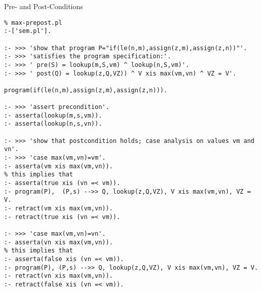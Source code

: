 \documentclass{beamer}
\begin{document}
\begin{frame}[fragile]{Pre- and Post-Conditions}

\tiny
\begin{verbatim}
% max-prepost.pl
:-['sem.pl'].

:- >>> 'show that program P="if(le(n,m),assign(z,m),assign(z,n))"'.
:- >>> 'satisfies the program specification:'.
:- >>> ' pre(S) = lookup(m,S,vm) ^ lookup(n,S,vm)'.
:- >>> ' post(Q) = lookup(z,Q,VZ)) ^ V xis max(vm,vn) ^ VZ = V'.

program(if(le(n,m),assign(z,m),assign(z,n))).

:- >>> 'assert precondition'.
:- asserta(lookup(m,s,vm)).
:- asserta(lookup(n,s,vn)).                                                                        
                                                                                                   
:- >>> 'show that postcondition holds; case analysis on values vm and vn'.                                                       
:- >>> 'case max(vm,vn)=vm'.                                                                       
:- asserta(vm xis max(vm,vn)).
% this implies that
:- asserta(true xis (vn =< vm)).
:- program(P),  (P,s) -->> Q, lookup(z,Q,VZ), V xis max(vm,vn), VZ = V.
:- retract(vm xis max(vm,vn)).
:- retract(true xis (vn =< vm)).

:- >>> 'case max(vm,vn)=vn'.
:- asserta(vn xis max(vm,vn)).
% this implies that
:- asserta(false xis (vn =< vm)).
:- program(P), (P,s) -->> Q, lookup(z,Q,VZ), V xis max(vm,vn), VZ = V.
:- retract(vn xis max(vm,vn)).
:- retract(false xis (vn =< vm)).
\end{verbatim}

\end{frame}
\end{document}
